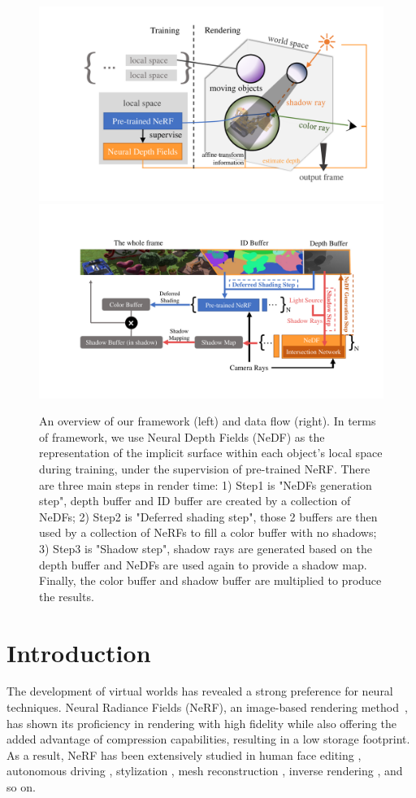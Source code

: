 \documentclass[letterpaper]{article}
\begin{document}
\begin{figure}[htbp]
    \centering
    \begin{minipage}{\linewidth}
      \includegraphics[width=0.45\linewidth]{figure/overview.pdf}
      \includegraphics[width=0.55\linewidth]{figure/data_flow.pdf}
    \end{minipage}
    \caption{An overview of our framework (left) and data flow (right). In terms of framework, we use Neural Depth Fields (NeDF) as the representation of the implicit surface within each object's local space during training, under the supervision of pre-trained NeRF. There are three main steps in render time: 1) Step1 is "NeDFs generation step", depth buffer and ID buffer are created by a collection of NeDFs; 2) Step2 is "Deferred shading step", those 2 buffers are then used by a collection of NeRFs to fill a color buffer with no shadows; 3) Step3 is "Shadow step", shadow rays are generated based on the depth buffer and NeDFs are used again to provide a shadow map. Finally, the color buffer and shadow buffer are multiplied to produce the results.}
    \label{fig:overview}
\end{figure}

\section{Introduction}
The development of virtual worlds has revealed a strong preference for neural techniques.
Neural Radiance Fields (NeRF), an image-based rendering method~\cite{mildenhall2020nerf}, has shown its proficiency in rendering with high fidelity while also offering the added advantage of compression capabilities, resulting in a low storage footprint. As a result, NeRF has been extensively studied in human face editing \cite{wang2022morf, jiang2022nerffaceediting}, autonomous driving \cite{tancik2022block, kundu2022panoptic}, stylization \cite{gu2021stylenerf}, mesh reconstruction \cite{wang2021neus, sun2022neural}, inverse rendering \cite{boss2021nerd, boss2021neural, zhang2021nerfactor}, and so on.
\end{document}
